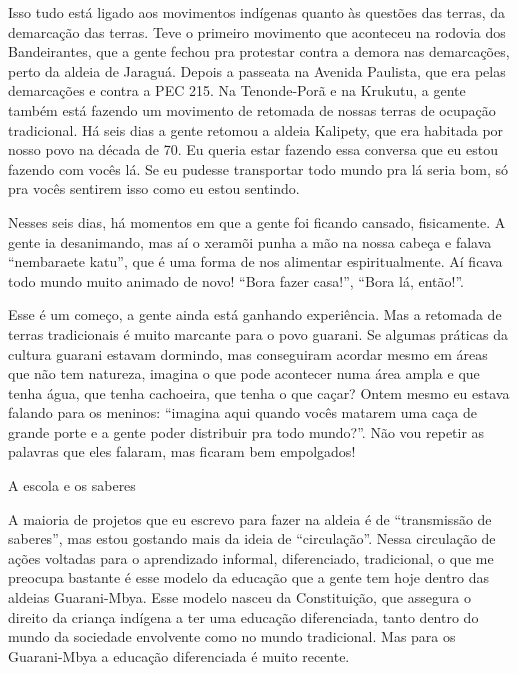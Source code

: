 \documentclass{article}
\begin{document}
Isso tudo est\'a ligado aos movimentos ind\'igenas quanto \`as
quest\~oes das terras, da demarca\c{c}\~ao das terras. Teve o primeiro
movimento que aconteceu na rodovia dos Bandeirantes, que a gente fechou
pra protestar contra a demora nas demarca\c{c}\~oes, perto da aldeia de
Jaragu\'a. Depois a passeata na Avenida Paulista, que era pelas
demarca\c{c}\~oes e contra a PEC 215. Na Tenonde-Por\~a e na Krukutu, a
gente tamb\'em est\'a fazendo um movimento de retomada de nossas terras
de ocupa\c{c}\~ao tradicional. H\'a seis dias a gente retomou a aldeia
Kalipety, que era habitada por nosso povo na d\'ecada de 70. Eu queria
estar fazendo essa conversa que eu estou fazendo com voc\^es l\'a. Se
eu pudesse transportar todo mundo pra l\'a seria bom, s\'o pra voc\^es
sentirem isso como eu estou sentindo.

Nesses seis dias, h\'a momentos em que a gente foi ficando cansado,
fisicamente. A gente ia desanimando, mas a\'i o xeram\~oi punha a m\~ao
na nossa cabe\c{c}a e falava {\textquotedblleft}nembaraete
katu{\textquotedblright}, que \'e uma forma de nos alimentar
espiritualmente. A\'i ficava todo mundo muito animado de novo!
{\textquotedblleft}Bora fazer casa!{\textquotedblright},
{\textquotedblleft}Bora l\'a, ent\~ao!{\textquotedblright}. 

Esse \'e um come\c{c}o, a gente ainda est\'a ganhando experi\^encia. Mas
a retomada de terras tradicionais \'e muito marcante para o povo
guarani. Se algumas pr\'aticas da cultura guarani estavam dormindo, mas
conseguiram acordar mesmo em \'areas que n\~ao tem natureza, imagina o
que pode acontecer numa \'area ampla e que tenha \'agua, que tenha
cachoeira, que tenha o que ca\c{c}ar? Ontem mesmo eu estava falando
para os meninos: {\textquotedblleft}imagina aqui quando voc\^es matarem
uma ca\c{c}a de grande porte e a gente poder distribuir pra todo
mundo?{\textquotedblright}. N\~ao vou repetir as palavras que eles
falaram, mas ficaram bem empolgados!

A escola e os saberes

A maioria de projetos que eu escrevo para fazer na aldeia \'e de
{\textquotedblleft}transmiss\~ao de saberes{\textquotedblright}, mas
estou gostando mais da ideia de
{\textquotedblleft}circula\c{c}\~ao{\textquotedblright}. Nessa
circula\c{c}\~ao de a\c{c}\~oes voltadas para o aprendizado informal,
diferenciado, tradicional, o que me preocupa bastante \'e esse modelo
da educa\c{c}\~ao que a gente tem hoje dentro das aldeias Guarani-Mbya.
Esse modelo nasceu da Constitui\c{c}\~ao, que assegura o direito da
crian\c{c}a ind\'igena a ter uma educa\c{c}\~ao diferenciada, tanto
dentro do mundo da sociedade envolvente como no mundo tradicional. Mas
para os Guarani-Mbya a educa\c{c}\~ao diferenciada \'e muito recente.
\end{document}
